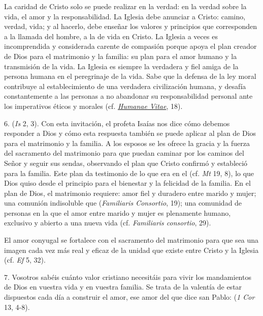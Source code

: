 \begin{body}
\begin{body}
		La caridad de Cristo solo se puede realizar en la verdad: en la verdad sobre la vida, el amor y la responsabilidad. La Iglesia debe anunciar a Cristo: camino, verdad, vida; y al hacerlo, debe enseñar los valores y principios que corresponden a la llamada del hombre, a la  de vida en Cristo. La Iglesia a veces es incomprendida y considerada carente de compasión porque apoya el plan creador de Dios para el matrimonio y la familia: su plan para el amor humano y la transmisión de la vida. La Iglesia es siempre la verdadera y fiel amiga de la persona humana en el peregrinaje de la vida. Sabe que la defensa de la ley moral contribuye al establecimiento de una verdadera civilización humana, y desafía constantemente a las personas a no abandonar su responsabilidad personal ante los imperativos éticos y morales (cf. \href{http://www.vatican.va/content/paul-vi/it/encyclicals/documents/hf_p-vi_enc_25071968_humanae-vitae.html}{\emph{\emph{Humanae Vitae}}}, 18).
		
		6.  (\emph{Is} 2, 3). Con esta invitación, el profeta Isaías nos dice cómo debemos responder a Dios y cómo esta respuesta también se puede aplicar al plan de Dios para el matrimonio y la familia. A los esposos se les ofrece la gracia y la fuerza del sacramento del matrimonio para que puedan caminar por los caminos del Señor y seguir sus sendas, observando el plan que Cristo confirmó y estableció para la familia. Este plan da testimonio de lo que era en el  (cf. \emph{Mt} 19, 8), lo que Dios quiso desde el principio para el bienestar y la felicidad de la familia. En el plan de Dios, el matrimonio requiere: amor fiel y duradero entre marido y mujer; una comunión indisoluble que  (\emph{Familiaris Consortio}, 19); una comunidad de personas en la que el amor entre marido y mujer es plenamente humano, exclusivo y abierto a una nueva vida (cf. \emph{Familiaris consortio}, 29).
		
		El amor conyugal se fortalece con el sacramento del matrimonio para que sea una imagen cada vez más real y eficaz de la unidad que existe entre Cristo y la Iglesia (cf. \emph{Ef} 5, 32).
		
		7. Vosotros sabéis cuánto valor cristiano necesitáis para vivir los mandamientos de Dios en vuestra vida y en vuestra familia. Se trata de la valentía de estar dispuestos cada día a construir el amor, ese amor del que dice san Pablo:  (\emph{1 Cor} 13, 4-8).
		

\end{body}
\end{body}
